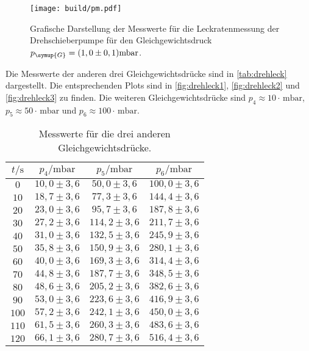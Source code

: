 \begin{figure}[H]
  \centering
  \texttt{[image: build/pm.pdf]}
  \caption{Grafische Darstellung der Messwerte für die Leckratenmessung der Drehschieberpumpe für den
  Gleichgewichtsdruck $p_{\symup{G}} = (1,0 \pm 0,1)\si{\milli\bar}$.}
  \label{fig:pm}
\end{figure}

Die Messwerte der anderen drei Gleichgewichtsdrücke sind in \autoref{tab:drehleck} dargestellt. Die entsprechenden
Plots sind in \autoref{fig:drehleck1}, \autoref{fig:drehleck2} und \autoref{fig:drehleck3} zu finden.
Die weiteren Gleichgewichtsdrücke sind
$p_4 \approx 10 \cdot \,\si{\milli\bar}$, $p_5 \approx 50 \cdot \,\si{\milli\bar}$ und
$p_6 \approx 100 \cdot \,\si{\milli\bar}$.

\begin{table}[H]
  \centering
  \caption{Messwerte für die drei anderen Gleichgewichtsdrücke.}
  \label{tab:drehleck}
  \begin{tabular}{c c c c}
    \toprule
    $t/\si{\second}$ & $p_4 /\si{\milli\bar}$ & $p_5 /\si{\milli\bar}$ & $p_6 /\si{\milli\bar}$ \\
    \midrule
    $  0$ & $ 10,0 \pm 3,6 $ & $  50,0 \pm  3,6 $ & $ 100,0 \pm 3,6 $ \\ 
    $ 10$ & $ 18,7 \pm 3,6 $ & $  77,3 \pm  3,6 $ & $ 144,4 \pm 3,6 $ \\ 
    $ 20$ & $ 23,0 \pm 3,6 $ & $  95,7 \pm  3,6 $ & $ 187,8 \pm 3,6 $ \\ 
    $ 30$ & $ 27,2 \pm 3,6 $ & $ 114,2 \pm  3,6 $ & $ 211,7 \pm 3,6 $ \\ 
    $ 40$ & $ 31,0 \pm 3,6 $ & $ 132,5 \pm  3,6 $ & $ 245,9 \pm 3,6 $ \\ 
    $ 50$ & $ 35,8 \pm 3,6 $ & $ 150,9 \pm  3,6 $ & $ 280,1 \pm 3,6 $ \\ 
    $ 60$ & $ 40,0 \pm 3,6 $ & $ 169,3 \pm  3,6 $ & $ 314,4 \pm 3,6 $ \\ 
    $ 70$ & $ 44,8 \pm 3,6 $ & $ 187,7 \pm  3,6 $ & $ 348,5 \pm 3,6 $ \\ 
    $ 80$ & $ 48,6 \pm 3,6 $ & $ 205,2 \pm  3,6 $ & $ 382,6 \pm 3,6 $ \\ 
    $ 90$ & $ 53,0 \pm 3,6 $ & $ 223,6 \pm  3,6 $ & $ 416,9 \pm 3,6 $ \\ 
    $100$ & $ 57,2 \pm 3,6 $ & $ 242,1 \pm  3,6 $ & $ 450,0 \pm 3,6 $ \\ 
    $110$ & $ 61,5 \pm 3,6 $ & $ 260,3 \pm  3,6 $ & $ 483,6 \pm 3,6 $ \\ 
    $120$ & $ 66,1 \pm 3,6 $ & $ 280,7 \pm  3,6 $ & $ 516,4 \pm 3,6 $ \\ 

\end{tabular}
\end{table}

